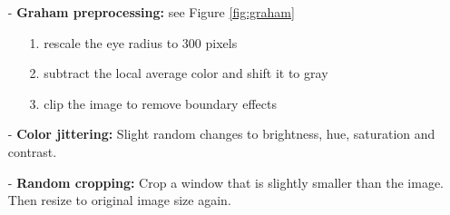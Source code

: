\documentclass{article}
\begin{document}
\begin{itemize}
  \item[-] \textbf{Graham preprocessing:}\cite{graham2015} see Figure \ref{fig:graham}\begin{itemize}
    \item[1.] rescale the eye radius to 300 pixels 
    \item[2.] subtract the local average color and shift it to gray
    \item[3.] clip the image to remove boundary effects
  \end{itemize}   
  \item[-] \textbf{Color jittering:} Slight random changes to brightness, hue, saturation and contrast.
  \item[-] \textbf{Random cropping:} Crop a window that is slightly smaller than the image. Then resize to original image size again.
\end{itemize}

\end{document}
